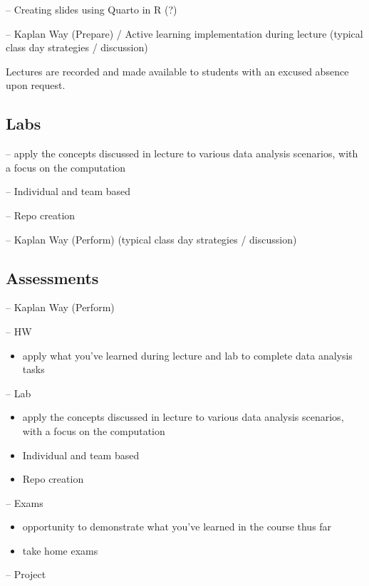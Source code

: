 \documentclass[
  12pt]{article}
\providecommand{\tightlist}{%
  \setlength{\itemsep}{0pt}\setlength{\parskip}{0pt}}\usepackage{longtable,booktabs,array}
\begin{document}
-- Creating slides using Quarto in R (?)

-- Kaplan Way (Prepare) / Active learning implementation during lecture
(typical class day strategies / discussion)

Lectures are recorded and made available to students with an excused
absence upon request.

\hypertarget{labs}{%
\subsection{Labs}\label{labs}}

-- apply the concepts discussed in lecture to various data analysis
scenarios, with a focus on the computation

-- Individual and team based

-- Repo creation

-- Kaplan Way (Perform) (typical class day strategies / discussion)

\hypertarget{assessments}{%
\subsection{Assessments}\label{assessments}}

-- Kaplan Way (Perform)

-- HW

\begin{itemize}
\tightlist
\item
  apply what you've learned during lecture and lab to complete data
  analysis tasks
\end{itemize}

-- Lab

\begin{itemize}
\item
  apply the concepts discussed in lecture to various data analysis
  scenarios, with a focus on the computation
\item
  Individual and team based
\item
  Repo creation
\end{itemize}

-- Exams

\begin{itemize}
\item
  opportunity to demonstrate what you've learned in the course thus far
\item
  take home exams
\end{itemize}

-- Project
\end{document}

